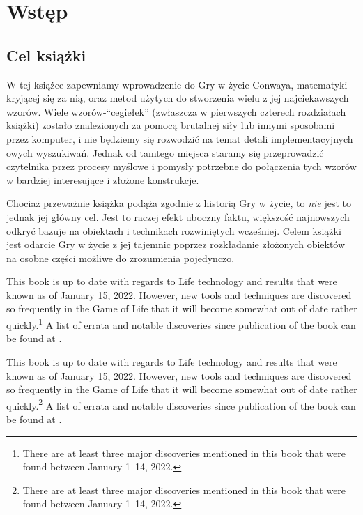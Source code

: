 \renewcommand{\chapterfolder}{preface/}
\chapter{Wstęp}


\section*{Cel książki}

W tej książce zapewniamy wprowadzenie do Gry w życie Conwaya, matematyki kryjącej się za nią, oraz metod użytych do stworzenia wielu z jej najciekawszych wzorów. Wiele wzorów-``cegiełek'' (zwłaszcza w pierwszych czterech rozdziałach książki) zostało znalezionych za pomocą brutalnej siły lub innymi sposobami przez komputer, i nie będziemy się rozwodzić na temat detali implementacyjnych owych wyszukiwań. Jednak od tamtego miejsca staramy się przeprowadzić czytelnika przez procesy myślowe i pomysły potrzebne do połączenia tych wzorów w bardziej interesujące i złożone konstrukcje.

Chociaż przeważnie książka podąża zgodnie z historią Gry w życie, to \emph{nie} jest to jednak jej główny cel. Jest to raczej efekt uboczny faktu, większość najnowszych odkryć bazuje na obiektach i technikach rozwiniętych wcześniej. Celem książki jest odarcie Gry w życie z jej tajemnic poprzez rozkładanie złożonych obiektów na osobne części możliwe do zrozumienia pojedynczo.

This book is up to date with regards to Life technology and results that were known as of January 15, 2022. However, new tools and techniques are discovered so frequently in the Game of Life that it will become somewhat out of date rather quickly.\footnote{There are at least three major discoveries mentioned in this book that were found between January 1--14, 2022.} A list of errata and notable discoveries since publication of the book can be found at .

This book is up to date with regards to Life technology and results that were known as of January 15, 2022. However, new tools and techniques are discovered so frequently in the Game of Life that it will become somewhat out of date rather quickly.\footnote{There are at least three major discoveries mentioned in this book that were found between January 1--14, 2022.} A list of errata and notable discoveries since publication of the book can be found at .


